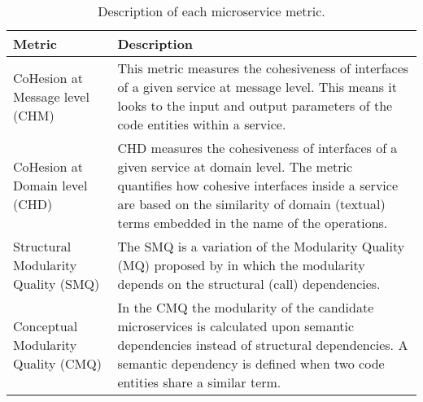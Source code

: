 \begin{table}[h]
    \small
    \caption{Description of each microservice metric.}\label{tab:ms_metrics}
    \begin{tabular}{>{\raggedright}m{120pt}>{\raggedright\arraybackslash}m{246pt}}
        \toprule
        Metric & Description\\
        \midrule
        CoHesion at Message level (CHM) & This metric measures the cohesiveness of interfaces of a given service at message level. This means it looks to the input and output parameters of the code entities within a service. \\
        \midrule
        CoHesion at Domain level (CHD) & CHD measures the cohesiveness of interfaces of a given service at domain level. The metric quantifies how cohesive interfaces inside a service are based on the similarity of domain (textual) terms embedded in the name of the operations.\\
        \midrule
        Structural Modularity Quality (SMQ) & The SMQ is a variation of the Modularity Quality (MQ) proposed by \citeauthor{mancoridis1998using} \cite{mancoridis1998using} in which the modularity depends on the structural (call) dependencies.\\
        \midrule
        Conceptual Modularity Quality (CMQ) & In the CMQ the modularity of the candidate microservices is calculated upon semantic dependencies instead of structural dependencies. A semantic dependency is defined when two code entities share a similar term.\\
        \bottomrule
    \end{tabular}
\end{table}